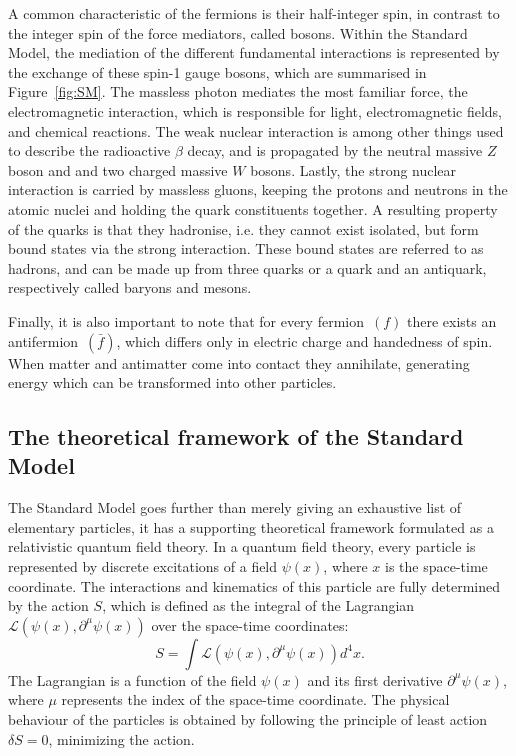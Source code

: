 A common characteristic of the fermions is their half-integer spin, in contrast to the integer spin of the force mediators, called bosons. Within the Standard Model, the mediation of the different fundamental interactions is represented by the exchange of these spin-1 gauge bosons, which are summarised in Figure~\ref{fig:SM}. The massless photon mediates the most familiar force, the electromagnetic interaction, which is responsible for light, electromagnetic fields, and chemical reactions. The weak nuclear interaction is among other things used to describe the radioactive $\beta$ decay, and is propagated by the neutral massive $Z$ boson and and two charged massive $W$ bosons. Lastly, the strong nuclear interaction is carried by massless gluons, keeping the protons and neutrons in the atomic nuclei and holding the quark constituents together. A resulting property of the quarks is that they hadronise, i.e. they cannot exist isolated, but form bound states via the strong interaction. These bound states are referred to as hadrons, and can be made up from three quarks or a quark and an antiquark, respectively called baryons and mesons.

Finally, it is also important to note that for every fermion~$(f)$ there exists an antifermion~$(\bar{f})$, which differs only in electric charge and handedness of spin. When matter and antimatter come into contact they annihilate, generating energy which can be transformed into other particles.

\subsection{The theoretical framework of the Standard Model}

The Standard Model goes further than merely giving an exhaustive list of elementary particles, it has a supporting theoretical framework formulated as a relativistic quantum field theory. In a quantum field theory, every particle is represented by discrete excitations of a field $\psi(x)$, where $x$ is the space-time coordinate. The interactions and kinematics of this particle are fully determined by the action $S$, which is defined as the integral of the Lagrangian  $\mathcal{L}(\psi(x), \partial^{\mu}\psi(x))$ over the space-time coordinates:
\begin{equation}
 S = \int\mathcal{L}(\psi(x), \partial^{\mu}\psi(x))d^4x.
\end{equation}
The Lagrangian  is a function of the field $\psi(x)$ and its first derivative $\partial^{\mu}\psi(x)$, where $\mu$ represents the index of the space-time coordinate. The physical behaviour of the particles is obtained by following the principle of least action $\delta S =0$, minimizing the action.

